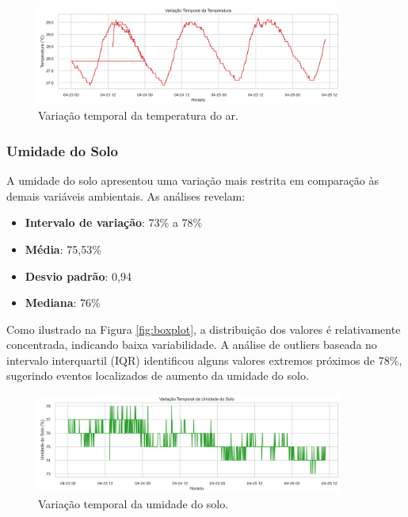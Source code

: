 \documentclass[12pt, a4paper]{article}
\begin{document}
\begin{figure}[H]
\centering
\includegraphics[width=0.9\textwidth]{graficos/temporal_temp.png}
\caption{Variação temporal da temperatura do ar.}
\label{fig:temporal_temp}
\end{figure}

\subsubsection{Umidade do Solo}
A umidade do solo apresentou uma variação mais restrita em comparação às demais variáveis ambientais. As análises revelam:

\begin{itemize}
    \item \textbf{Intervalo de variação}: 73\% a 78\%
    \item \textbf{Média}: 75{,}53\%
    \item \textbf{Desvio padrão}: 0{,}94
    \item \textbf{Mediana}: 76\%
\end{itemize}

Como ilustrado na Figura \ref{fig:boxplot}, a distribuição dos valores é relativamente concentrada, indicando baixa variabilidade. A análise de outliers baseada no intervalo interquartil (IQR) identificou alguns valores extremos próximos de 78\%, sugerindo eventos localizados de aumento da umidade do solo.

\begin{figure}[H]
\centering
\includegraphics[width=0.9\textwidth]{graficos/temporal_usolo.png}
\caption{Variação temporal da umidade do solo.}
\label{fig:temporal_usolo}
\end{figure}
\end{document}
